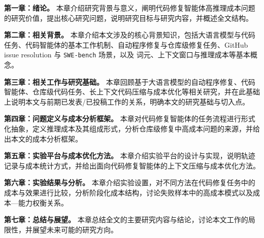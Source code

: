 \textbf{第一章：绪论。} 本章介绍研究背景与意义，阐明代码修复智能体高推理成本问题的研究价值，提出核心研究问题，说明研究目标与研究内容，并概述全文结构。

\textbf{第二章：相关背景。} 本章介绍本文涉及的核心背景知识，包括大语言模型与代码任务、代码智能体的基本工作机制、自动程序修复与仓库级修复任务、GitHub issue resolution 与 \texttt{SWE-bench} 场景，以及 词元、上下文窗口与推理成本等基本概念。

\textbf{第三章：相关工作与研究基础。} 本章回顾基于大语言模型的自动程序修复、代码智能体、仓库级代码任务、长上下文代码压缩与成本优化等相关研究，并在此基础上说明本文与前期已发表/已投稿工作的关系，明确本文的研究基础与切入点。

\textbf{第四章：问题定义与成本分析框架。} 本章对代码修复智能体的任务流程进行形式化抽象，定义推理成本及其组成形式，分析仓库级修复中高成本问题的来源，并给出本文的成本分析框架。

\textbf{第五章：实验平台与成本优化方法。} 本章介绍实验平台的设计与实现，说明轨迹记录与成本统计方式，并给出面向代码修复智能体的上下文压缩与成本优化方法。

\textbf{第六章：实验结果与分析。} 本章介绍实验设置，对不同方法在代码修复任务中的成本与效果进行比较，分析阶段化成本结构，讨论失败样本中的高成本模式以及成本—能力权衡关系。

\textbf{第七章：总结与展望。} 本章总结全文的主要研究内容与结论，讨论本文工作的局限性，并展望未来可能的研究方向。